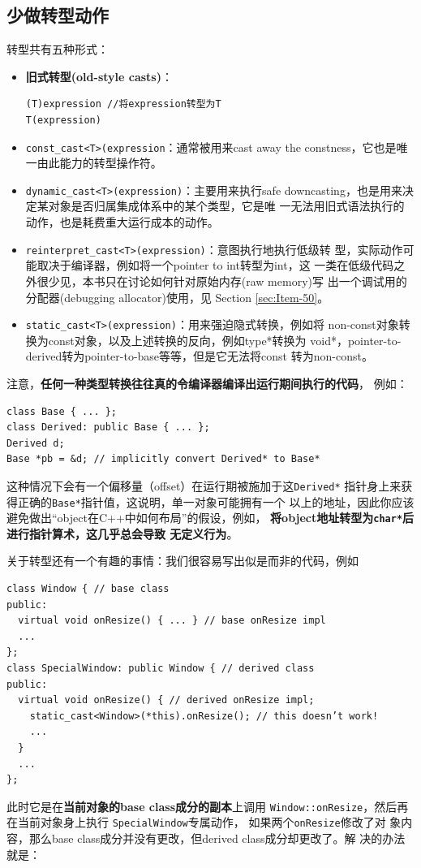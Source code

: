 \subsection{少做转型动作}
\label{sec:Item-27}

转型共有五种形式：
\begin{itemize}
\item \textbf{旧式转型(old-style casts)}：
\begin{verbatim}
(T)expression //将expression转型为T
T(expression)
\end{verbatim}
\item \texttt{const\_cast<T>(expression}：通常被用来cast away the
  constness，它也是唯一由此能力的转型操作符。
\item \texttt{dynamic\_cast<T>(expression)}：主要用来执行safe
  downcasting，也是用来决定某对象是否归属集成体系中的某个类型，它是唯
  一无法用旧式语法执行的动作，也是耗费重大运行成本的动作。
\item \texttt{reinterpret\_cast<T>(expression)}：意图执行地执行低级转
  型，实际动作可能取决于编译器，例如将一个pointer to int转型为int，这
  一类在低级代码之外很少见，本书只在讨论如何针对原始内存(raw memory)写
  出一个调试用的分配器(debugging allocator)使用，见 Section
  \ref{sec:Item-50}。
\item \texttt{static\_cast<T>(expression)}：用来强迫隐式转换，例如将
  non-const对象转换为const对象，以及上述转换的反向，例如type*转换为
  void*，pointer-to-derived转为pointer-to-base等等，但是它无法将const
  转为non-const。
\end{itemize}

注意，\textbf{任何一种类型转换往往真的令编译器编译出运行期间执行的代码}，
例如：
\begin{verbatim}
class Base { ... };
class Derived: public Base { ... };
Derived d;
Base *pb = &d; // implicitly convert Derived* to Base*
\end{verbatim}
这种情况下会有一个偏移量（offset）在运行期被施加于这\texttt{Derived*}
指针身上来获得正确的\texttt{Base*}指针值，这说明，单一对象可能拥有一个
以上的地址，因此你应该避免做出“object在C++中如何布局”的假设，例如，
\textbf{将object地址转型为\texttt{char*}后进行指针算术，这几乎总会导致
  无定义行为}。

关于转型还有一个有趣的事情：我们很容易写出似是而非的代码，例如
\begin{verbatim}
class Window { // base class
public:
  virtual void onResize() { ... } // base onResize impl
  ...
};
class SpecialWindow: public Window { // derived class
public:
  virtual void onResize() { // derived onResize impl;
    static_cast<Window>(*this).onResize(); // this doesn’t work!
    ...
  }
  ...
};
\end{verbatim}
此时它是在\textbf{当前对象的base class成分的副本}上调用
\texttt{Window::onResize}，然后再在当前对象身上执行
\texttt{SpecialWindow}专属动作， 如果两个\texttt{onResize}修改了对
象内容，那么base class成分并没有更改，但derived class成分却更改了。解
决的办法就是：

